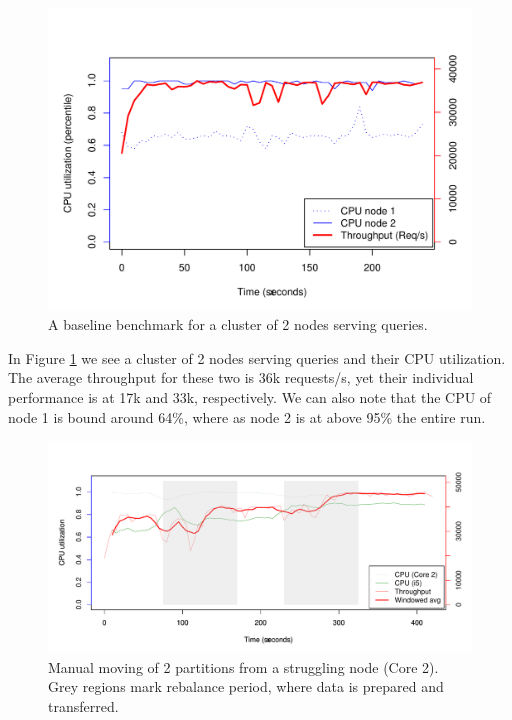 \begin{figure}[h]
    \centering
    \includegraphics[width=1.0\textwidth]{results/baseline_slowpro_mini}
    \caption{A baseline benchmark for a cluster of 2 nodes serving queries.}
    \label{fig:adaptive_base}
\end{figure}

In Figure \ref{fig:adaptive_base} we see a cluster of 2 nodes serving queries and their CPU utilization. The average throughput for these two is 36k requests/s, yet their individual performance is at 17k and 33k, respectively. We can also note that the CPU of node 1 is bound around 64\%, where as node 2 is at above 95\% the entire run.

\clearpage
\begin{figure}[h]
    \centering
    \includegraphics[width=1.1\textwidth]{results/rebalance_manual_2node}
    \caption{Manual moving of 2 partitions from a struggling node (Core 2). Grey regions mark rebalance period, where data is prepared and transferred.}
    \label{fig:adaptive_man}
\end{figure}

